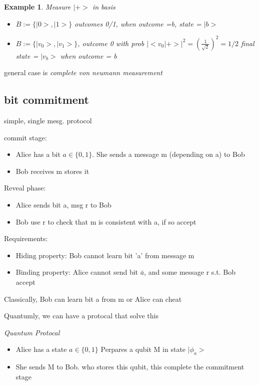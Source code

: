 \documentclass[10pt]{article}
\theoremstyle{break}
\newtheorem{ex}[thm]{Example}
\begin{document}
\begin{ex}
    Measure $|+>$ in basis 
    \begin{itemize}
        \item $B:=\{|0>,|1>\}$ outcomes 0/1, when outcome =b, state = $|b>$
        \item $B:=\{|v_0>,|v_1>\}$, outcome 0 with prob $|<v_0|+>|^2 = (\frac{1}{\sqrt{2}})^2=1/2$
        final state = $|v_b>$ when outcome = b
    \end{itemize}
\end{ex}

general case is 
\emph{complete von neumann measurement}

\subsection{bit commitment}
simple, single mesg. protocol

commit stage:
\begin{itemize}
    \item Alice has a bit $a\in \{0,1\}$. She sends a message m (depending on a) to Bob
    \item Bob receives m stores it
\end{itemize}

Reveal phase:
\begin{itemize}
    \item Alice sends bit a, msg r to Bob
    \item Bob use r to check that m is consistent with a, if so accept
\end{itemize}

Requirements:
\begin{itemize}
    \item Hiding property: Bob cannot learn bit 'a' from message m 
    \item Binding property: Alice cannot send bit $\bar{a}$, and some message r s.t. Bob accept
\end{itemize}

Classically, Bob can learn bit a from m or Alice can cheat

Quantumly, we can have a protocal that solve this 

\emph{Quantum Protocal}
\begin{itemize}
    \item 
Alice has a state $a\in \{0,1\}$ Perpares a qubit M in state $|\phi_a>$
    \item She sends M to Bob. who stores this qubit, this complete the commitment stage
\end{itemize}
\end{document}
